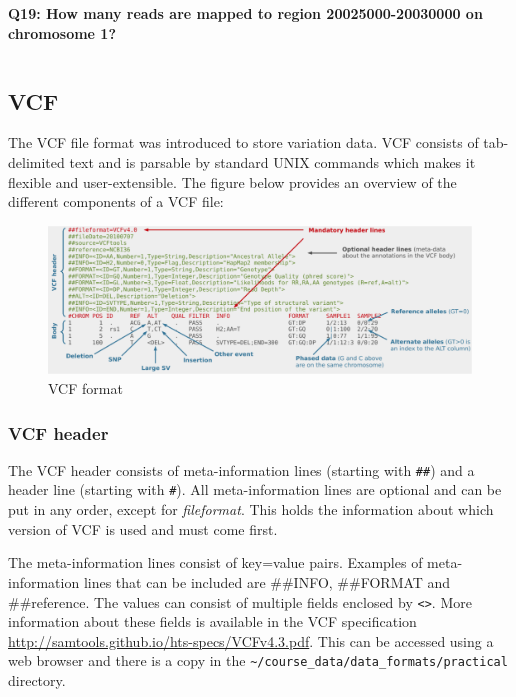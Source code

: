 \documentclass[11pt]{article}
\makeatletter
\newcommand{\boxspacing}{\kern\kvtcb@left@rule\kern\kvtcb@boxsep}
\newcommand{\prompt}[4]{
        {\ttfamily\llap{{\color{blue}\LARGE\faKeyboardO\hspace{3pt}#4}}\vspace{-\baselineskip}}
    }
\makeatother
\begin{document}
\textbf{Q19: How many reads are mapped to region 20025000-20030000 on
chromosome 1?}

    \begin{tcolorbox}[breakable, size=fbox, boxrule=1pt, pad at break*=1mm,colback=cellbackground, colframe=cellborder]
\prompt{In}{incolor}{ }{\boxspacing}
\begin{Verbatim}[commandchars=\\\{\}]

\end{Verbatim}
\end{tcolorbox}

    \hypertarget{vcf}{%
\subsection{VCF}\label{vcf}}

The VCF file format was introduced to store variation data. VCF consists
of tab-delimited text and is parsable by standard UNIX commands which
makes it flexible and user-extensible. The figure below provides an
overview of the different components of a VCF file:

    \begin{figure}[!h]
\centering
\includegraphics{img/VCF1.png}
\caption{VCF format}
\end{figure}

    \hypertarget{vcf-header}{%
\subsubsection{VCF header}\label{vcf-header}}

The VCF header consists of meta-information lines (starting with
\texttt{\#\#}) and a header line (starting with \texttt{\#}). All
meta-information lines are optional and can be put in any order, except
for \textit{fileformat}. This holds the information about which version of
VCF is used and must come first.

The meta-information lines consist of key=value pairs. Examples of
meta-information lines that can be included are \#\#INFO, \#\#FORMAT and
\#\#reference. The values can consist of multiple fields enclosed by
\texttt{\textless{}\textgreater{}}. More information about these fields
is available in the VCF specification
\url{http://samtools.github.io/hts-specs/VCFv4.3.pdf}. This can be
accessed using a web browser and there is a copy in the \lstinline{~/course_data/data_formats/practical} directory.
\end{document}
